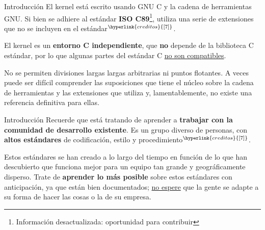 \begin{frame}[c]{Introducción}
  El kernel está escrito usando GNU C y la cadena de herramientas GNU.
  Si bien se adhiere al estándar \textbf{ISO
  C89}\footnote{Información desactualizada: oportunidad para contribuir},
  utiliza una serie de extensiones
  que no se incluyen en el estándar$^{\hyperlink{creditos}{[7]}}$.

  \vspace{\baselineskip}
  El kernel es un \textbf{entorno C independiente}, que \textbf{no}
  depende de la biblioteca C estándar,
  por lo que algunas partes del estándar C \underline{no son compatibles}.

  \vspace{\baselineskip}
  No se permiten divisiones largas largas arbitrarias ni puntos flotantes.
  A veces puede ser difícil comprender las suposiciones que tiene el núcleo
  sobre la cadena de herramientas y las extensiones que utiliza y,
  lamentablemente, no existe una referencia definitiva para ellas.
\end{frame}

\begin{frame}[c]{Introducción}
  Recuerde que está tratando de aprender a \textbf{trabajar con la comunidad de
  desarrollo existente}. Es un grupo diverso de personas, con
  \textbf{altos estándares}
  de codificación, estilo y procedimiento$^{\hyperlink{creditos}{[7]}}$.

  \vspace{\baselineskip}
  Estos estándares se han creado a lo largo del tiempo en función de lo que
  han descubierto que funciona mejor para un equipo tan grande y
  geográficamente disperso. Trate de \textbf{aprender lo más posible}
  sobre estos estándares con anticipación, ya que están bien documentados;
  \underline{no espere} que la gente se adapte a su forma de hacer
  las cosas o la de su empresa.
\end{frame}

